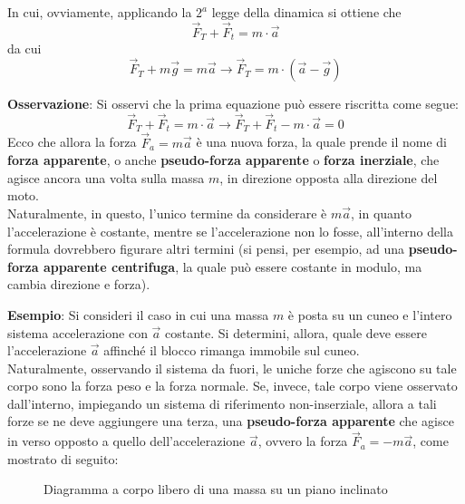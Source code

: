 \documentclass[a4paper]{extarticle}
\begin{document}
\vspace{1em}
\noindent
In cui, ovviamente, applicando la $2^a$ legge della dinamica si ottiene che
\[\vec{F}_T + \vec{F}_t = m \cdot \vec{a}\]
da cui
\[\vec{F}_T + m \vec{g} = m \vec{a} \longrightarrow \vec{F}_T = m \cdot \left(\vec{a} - \vec{g}\right)\]

\vspace{1em}
\noindent
\textbf{Osservazione}: Si osservi che la prima equazione può essere riscritta come segue:
\[\vec{F}_T + \vec{F}_t = m \cdot \vec{a} \longrightarrow \vec{F}_T + \vec{F}_t - m \cdot \vec{a} = 0\]
Ecco che allora la forza $\vec{F}_a = m \vec{a}$ è una nuova forza, la quale prende il nome di \textbf{forza apparente}, o anche \textbf{pseudo-forza apparente} o \textbf{forza inerziale}, che agisce ancora una volta sulla massa $m$, in direzione opposta alla direzione del moto.\\
Naturalmente, in questo, l'unico termine da considerare è $m \vec{a}$, in quanto l'accelerazione è costante, mentre se l'accelerazione non lo fosse, all'interno della formula dovrebbero figurare altri termini (si pensi, per esempio, ad una \textbf{pseudo-forza apparente centrifuga}, la quale può essere costante in modulo, ma cambia direzione e forza).

\vspace{1em}
\noindent
\textbf{Esempio}: Si consideri il caso in cui una massa $m$ è posta su un cuneo e l'intero sistema accelerazione con $\vec{a}$ costante. Si determini, allora, quale deve essere l'accelerazione $\vec{a}$ affinché il blocco rimanga immobile sul cuneo.\\
Naturalmente, osservando il sistema da fuori, le uniche forze che agiscono su tale corpo sono la forza peso e la forza normale. Se, invece, tale corpo viene osservato dall'interno, impiegando un sistema di riferimento non-inserziale, allora a tali forze se ne deve aggiungere una terza, una \textbf{pseudo-forza apparente} che agisce in verso opposto a quello dell'accelerazione $\vec{a}$, ovvero la forza $\vec{F}_a = - m \vec{a}$, come mostrato di seguito:

\vspace{1em}
\begin{figure}[H]
  \centering
  \caption{Diagramma a corpo libero di una massa su un piano inclinato}
  \label{fig:diagramma_corpo_libero_massa_piano_inclinato}
\end{figure}
\end{document}
